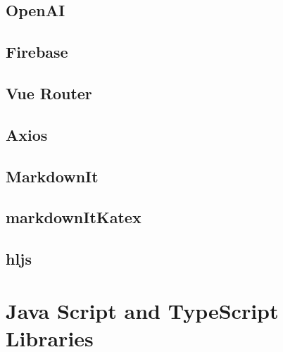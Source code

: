 \subsection{OpenAI}

\subsection{Firebase}

\subsection{Vue Router}

\subsection{Axios}

\subsection{MarkdownIt}

\subsection{markdownItKatex}

\subsection{hljs}




\section{Java Script and TypeScript Libraries}











